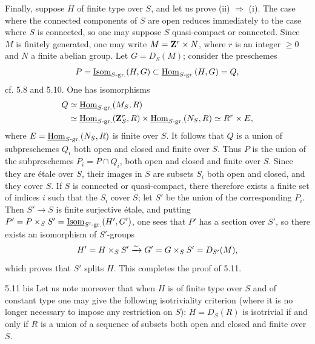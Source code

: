 Finally, suppose $H$ of finite type over $S$, and let us prove (ii) $\Rightarrow$ (i). The case where the connected components of $S$ are open reduces immediately to the case where $S$ is connected, so one may suppose $S$ quasi-compact or connected. Since $M$ is finitely generated, one may write $M=\mathbf{Z}^r\times N$, where $r$ is an integer $\geq0$ and $N$ a finite abelian group. Let $G=D_S(M)$; consider the preschemes
\[
P=\underline{\operatorname{Isom}}_{S\text{-}\mathrm{gr.}}(H,G)\subset\underline{\operatorname{Hom}}_{S\text{-}\mathrm{gr.}}(H,G)=Q,
\]
cf. 5.8 and 5.10. One has isomorphisms
\[
\begin{aligned}
Q&\simeq\underline{\operatorname{Hom}}_{S\text{-}\mathrm{gr.}}(M_S,R)\\
&\simeq\underline{\operatorname{Hom}}_{S\text{-}\mathrm{gr.}}(\mathbf{Z}^r_S,R)\times\underline{\operatorname{Hom}}_{S\text{-}\mathrm{gr.}}(N_S,R)\simeq R^r\times E,
\end{aligned}
\]
where $E=\underline{\operatorname{Hom}}_{S\text{-}\mathrm{gr.}}(N_S,R)$ is finite over $S$. It follows that $Q$ is a union of subpreschemes $Q_i$ both open and closed and finite over $S$. Thus $P$ is the union of the subpreschemes $P_i=P\cap Q_i$, both open and closed and finite over $S$. Since they are étale over $S$, their images in $S$ are subsets $S_i$ both open and closed, and they cover $S$. If $S$ is connected or quasi-compact, there therefore exists a finite set of indices $i$ such that the $S_i$ cover $S$; let $S'$ be the union of the corresponding $P_i$. Then $S'\to S$ is finite surjective étale, and putting $P'=P\times_S S'=\underline{\operatorname{Isom}}_{S'\text{-}\mathrm{gr.}}(H',G')$, one sees that $P'$ has a section over $S'$, so there exists an isomorphism of $S'$-groups
\[
H'=H\times_S S'\xrightarrow{\sim} G'=G\times_S S'=D_{S'}(M),
\]
which proves that $S'$ splits $H$. This completes the proof of 5.11.
\begin{remark}{5.11 bis}\label{X.5.11bis}
Let us note moreover that when $H$ is of finite type over $S$ and of constant type one may give the following isotriviality criterion (where it is no longer necessary to impose any restriction on $S$): $H=D_S(R)$ is isotrivial if and only if $R$ is a union of a sequence of subsets both open and closed and finite over $S$.
\end{remark}
